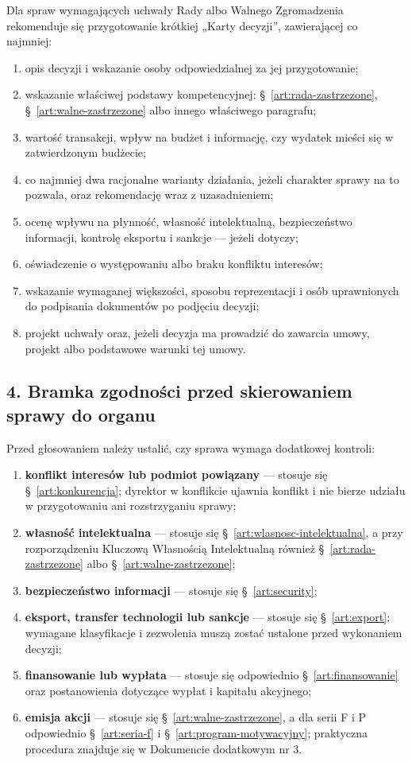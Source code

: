 \documentclass[12pt,a4paper]{report}
\newcounter{paragraf}
\begin{document}
Dla spraw wymagających uchwały Rady albo Walnego Zgromadzenia rekomenduje się przygotowanie krótkiej „Karty decyzji”, zawierającej co najmniej:
\begin{enumerate}
  \item opis decyzji i wskazanie osoby odpowiedzialnej za jej przygotowanie;
  \item wskazanie właściwej podstawy kompetencyjnej: §~\ref{art:rada-zastrzezone}, §~\ref{art:walne-zastrzezone} albo innego właściwego paragrafu;
  \item wartość transakcji, wpływ na budżet i informację, czy wydatek mieści się w zatwierdzonym budżecie;
  \item co najmniej dwa racjonalne warianty działania, jeżeli charakter sprawy na to pozwala, oraz rekomendację wraz z uzasadnieniem;
  \item ocenę wpływu na płynność, własność intelektualną, bezpieczeństwo informacji, kontrolę eksportu i sankcje — jeżeli dotyczy;
  \item oświadczenie o występowaniu albo braku konfliktu interesów;
  \item wskazanie wymaganej większości, sposobu reprezentacji i osób uprawnionych do podpisania dokumentów po podjęciu decyzji;
  \item projekt uchwały oraz, jeżeli decyzja ma prowadzić do zawarcia umowy, projekt albo podstawowe warunki tej umowy.
\end{enumerate}

\subsection*{4. Bramka zgodności przed skierowaniem sprawy do organu}

Przed głosowaniem należy ustalić, czy sprawa wymaga dodatkowej kontroli:
\begin{enumerate}
  \item \textbf{konflikt interesów lub podmiot powiązany} — stosuje się §~\ref{art:konkurencja}; dyrektor w konflikcie ujawnia konflikt i nie bierze udziału w przygotowaniu ani rozstrzyganiu sprawy;
  \item \textbf{własność intelektualna} — stosuje się §~\ref{art:wlasnosc-intelektualna}, a przy rozporządzeniu Kluczową Własnością Intelektualną również §~\ref{art:rada-zastrzezone} albo §~\ref{art:walne-zastrzezone};
  \item \textbf{bezpieczeństwo informacji} — stosuje się §~\ref{art:security};
  \item \textbf{eksport, transfer technologii lub sankcje} — stosuje się §~\ref{art:export}; wymagane klasyfikacje i zezwolenia muszą zostać ustalone przed wykonaniem decyzji;
  \item \textbf{finansowanie lub wypłata} — stosuje się odpowiednio §~\ref{art:finansowanie} oraz postanowienia dotyczące wypłat i kapitału akcyjnego;
  \item \textbf{emisja akcji} — stosuje się §~\ref{art:walne-zastrzezone}, a dla serii F i P odpowiednio §~\ref{art:seria-f} i §~\ref{art:program-motywacyjny}; praktyczna procedura znajduje się w Dokumencie dodatkowym nr 3.
\end{enumerate}
\end{document}
